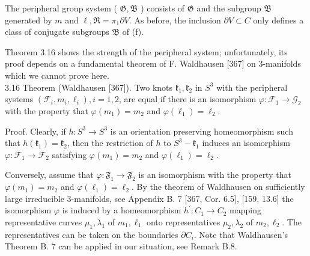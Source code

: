 \documentclass[10pt, letterpaper]{article}
\begin{document}
The peripheral group system ( $\mathfrak{G}, \mathfrak{B}$ ) consists of $\mathfrak{G}$ and the subgroup $\mathfrak{B}$ generated by $m$ and $\ell, \Re=\pi_{1} \partial V$. As before, the inclusion $\partial V \subset C$ only defines a class of conjugate subgroups $\mathfrak{B}$ of (f).

Theorem 3.16 shows the strength of the peripheral system; unfortunately, its proof depends on a fundamental theorem of F. Waldhausen [367] on 3-manifolds which we cannot prove here.\\[0pt]
3.16 Theorem (Waldhausen [367]). Two knots $\mathfrak{k}_{1}, \mathfrak{k}_{2}$ in $S^{3}$ with the peripheral systems $\left(\mathscr{F}_{i}, m_{i}, \ell_{i}\right), i=1,2$, are equal if there is an isomorphism $\varphi: \mathscr{F}_{1} \rightarrow \mathscr{G}_{2}$ with the property that $\varphi\left(m_{1}\right)=m_{2}$ and $\varphi\left(\ell_{1}\right)=\ell_{2}$.

Proof. Clearly, if $h: S^{3} \rightarrow S^{3}$ is an orientation preserving homeomorphism such that $h\left(\mathfrak{k}_{1}\right)=\mathfrak{k}_{2}$, then the restriction of $h$ to $S^{3}-\mathfrak{k}_{1}$ induces an isomorphism $\varphi: \mathscr{F}_{1} \rightarrow \mathscr{F}_{2}$ satisfying $\varphi\left(m_{1}\right)=m_{2}$ and $\varphi\left(\ell_{1}\right)=\ell_{2}$.

Conversely, assume that $\varphi: \mathfrak{F}_{1} \rightarrow \mathfrak{F}_{2}$ is an isomorphism with the property that $\varphi\left(m_{1}\right)=m_{2}$ and $\varphi\left(\ell_{1}\right)=\ell_{2}$. By the theorem of Waldhausen on sufficiently large irreducible 3-manifolds, see Appendix B. 7 [367, Cor. 6.5], [159, 13.6] the isomorphism $\varphi$ is induced by a homeomorphism $h^{\prime}: C_{1} \rightarrow C_{2}$ mapping representative curves $\mu_{1}, \lambda_{1}$ of $m_{1}, \ell_{1}$ onto representatives $\mu_{2}, \lambda_{2}$ of $m_{2}, \ell_{2}$. The representatives can be taken on the boundaries $\partial C_{i}$. Note that Waldhausen's Theorem B. 7 can be applied in our situation, see Remark B.8.
\end{document}
